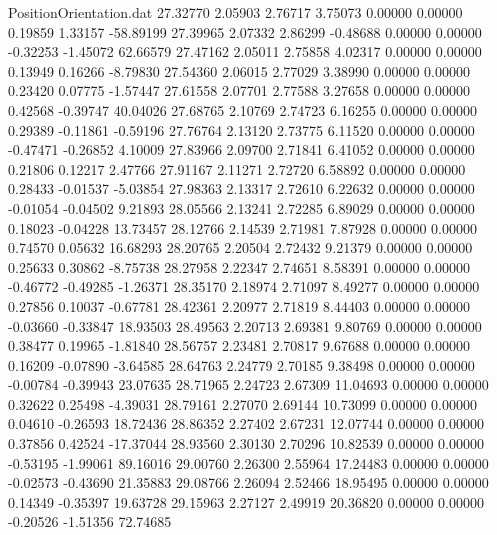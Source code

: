 \begin{filecontents}{PositionOrientation.dat}
  27.32770    2.05903    2.76717     3.75073    0.00000    0.00000    0.19859    1.33157  -58.89199
  27.39965    2.07332    2.86299    -0.48688    0.00000    0.00000   -0.32253   -1.45072   62.66579
  27.47162    2.05011    2.75858     4.02317    0.00000    0.00000    0.13949    0.16266   -8.79830
  27.54360    2.06015    2.77029     3.38990    0.00000    0.00000    0.23420    0.07775   -1.57447
  27.61558    2.07701    2.77588     3.27658    0.00000    0.00000    0.42568   -0.39747   40.04026
  27.68765    2.10769    2.74723     6.16255    0.00000    0.00000    0.29389   -0.11861   -0.59196
  27.76764    2.13120    2.73775     6.11520    0.00000    0.00000   -0.47471   -0.26852    4.10009
  27.83966    2.09700    2.71841     6.41052    0.00000    0.00000    0.21806    0.12217    2.47766
  27.91167    2.11271    2.72720     6.58892    0.00000    0.00000    0.28433   -0.01537   -5.03854
  27.98363    2.13317    2.72610     6.22632    0.00000    0.00000   -0.01054   -0.04502    9.21893
  28.05566    2.13241    2.72285     6.89029    0.00000    0.00000    0.18023   -0.04228   13.73457
  28.12766    2.14539    2.71981     7.87928    0.00000    0.00000    0.74570    0.05632   16.68293
  28.20765    2.20504    2.72432     9.21379    0.00000    0.00000    0.25633    0.30862   -8.75738
  28.27958    2.22347    2.74651     8.58391    0.00000    0.00000   -0.46772   -0.49285   -1.26371
  28.35170    2.18974    2.71097     8.49277    0.00000    0.00000    0.27856    0.10037   -0.67781
  28.42361    2.20977    2.71819     8.44403    0.00000    0.00000   -0.03660   -0.33847   18.93503
  28.49563    2.20713    2.69381     9.80769    0.00000    0.00000    0.38477    0.19965   -1.81840
  28.56757    2.23481    2.70817     9.67688    0.00000    0.00000    0.16209   -0.07890   -3.64585
  28.64763    2.24779    2.70185     9.38498    0.00000    0.00000   -0.00784   -0.39943   23.07635
  28.71965    2.24723    2.67309    11.04693    0.00000    0.00000    0.32622    0.25498   -4.39031
  28.79161    2.27070    2.69144    10.73099    0.00000    0.00000    0.04610   -0.26593   18.72436
  28.86352    2.27402    2.67231    12.07744    0.00000    0.00000    0.37856    0.42524  -17.37044
  28.93560    2.30130    2.70296    10.82539    0.00000    0.00000   -0.53195   -1.99061   89.16016
  29.00760    2.26300    2.55964    17.24483    0.00000    0.00000   -0.02573   -0.43690   21.35883
  29.08766    2.26094    2.52466    18.95495    0.00000    0.00000    0.14349   -0.35397   19.63728
  29.15963    2.27127    2.49919    20.36820    0.00000    0.00000   -0.20526   -1.51356   72.74685

\end{filecontents}

